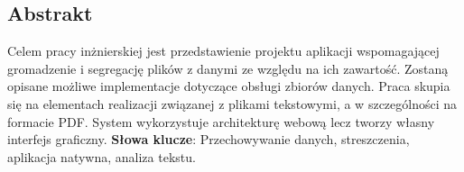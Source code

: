 \documentclass[12pt,a4paper,twoside]{article}
\begin{document}
\subsection*{Abstrakt}
Celem pracy inżnierskiej jest przedstawienie projektu aplikacji wspomagającej gromadzenie i segregację plików z danymi ze względu na ich zawartość. Zostaną opisane możliwe implementacje dotyczące obsługi zbiorów danych. Praca skupia się na elementach realizacji związanej z plikami tekstowymi, a w szczególności na formacie PDF. System wykorzystuje architekturę webową lecz tworzy własny interfejs graficzny.\newline\newline
\textbf{Słowa klucze}: Przechowywanie danych, streszczenia, aplikacja natywna, analiza tekstu.
\newpage
\tableofcontents
\newpage
\end{document}
